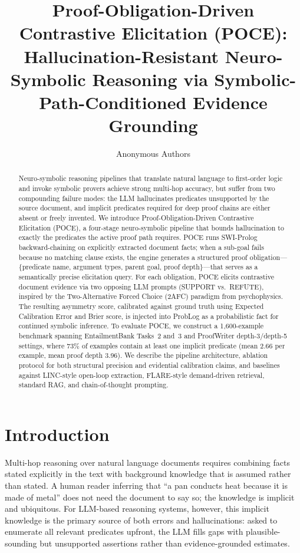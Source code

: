 \documentclass[11pt,letterpaper]{article}
\title{\textbf{Proof-Obligation-Driven Contrastive Elicitation (POCE):
Hallucination-Resistant Neuro-Symbolic Reasoning via
Symbolic-Path-Conditioned Evidence Grounding}}
\author{
Anonymous Authors
}
\date{}
\begin{document}
\maketitle

\begin{abstract}
Neuro-symbolic reasoning pipelines that translate natural language to first-order logic and invoke symbolic provers achieve
strong multi-hop accuracy, but suffer from two compounding failure modes: the LLM hallucinates predicates unsupported by
the source document, and implicit predicates required for deep proof chains are either absent or freely invented. We introduce
Proof-Obligation-Driven Contrastive Elicitation (POCE), a four-stage neuro-symbolic pipeline that bounds hallucination to
exactly the predicates the active proof path requires. POCE runs SWI-Prolog backward-chaining on explicitly extracted document
facts; when a sub-goal fails because no matching clause exists, the engine generates a structured proof obligation---\{predicate
name, argument types, parent goal, proof depth\}---that serves as a semantically precise elicitation query. For each obligation,
POCE elicits contrastive document evidence via two opposing LLM prompts (SUPPORT vs.\ REFUTE), inspired by the Two-Alternative
Forced Choice (2AFC) paradigm from psychophysics. The resulting asymmetry score, calibrated against ground truth using Expected
Calibration Error and Brier score, is injected into ProbLog as a probabilistic fact for continued symbolic inference. To
evaluate POCE, we construct a 1,600-example benchmark spanning EntailmentBank Tasks~2 and~3 and ProofWriter depth-3/depth-5
settings, where 73\% of examples contain at least one implicit predicate (mean 2.66 per example, mean proof depth 3.96).
We describe the pipeline architecture, ablation protocol for both structural precision and evidential calibration claims,
and baselines against LINC-style open-loop extraction, FLARE-style demand-driven retrieval, standard RAG, and chain-of-thought
prompting.
\end{abstract}

\section{Introduction}

Multi-hop reasoning over natural language documents requires combining facts stated explicitly
in the text with background knowledge that is assumed rather than stated. A human reader inferring that ``a pan conducts
heat because it is made of metal'' does not need the document to say so; the knowledge is implicit and ubiquitous. For
LLM-based reasoning systems, however, this implicit knowledge is the primary source of both errors and hallucinations:
asked to enumerate all relevant predicates upfront, the LLM fills gaps with plausible-sounding but unsupported assertions
rather than evidence-grounded estimates.
\end{document}
